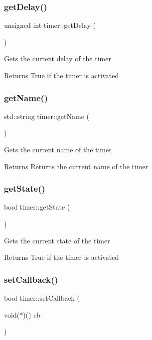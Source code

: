 \subsubsection{\texorpdfstring{get\+Delay()}{getDelay()}}
{\footnotesize\ttfamily unsigned int timer\+::get\+Delay (\begin{DoxyParamCaption}{ }\end{DoxyParamCaption})}

Gets the current delay of the timer \begin{DoxyReturn}{Returns}
True if the timer is activated 
\end{DoxyReturn}
\mbox{\label{classtimer_a30d5e497b9bee9b2d00c7f511c85e84d}} 
\subsubsection{\texorpdfstring{get\+Name()}{getName()}}
{\footnotesize\ttfamily std\+::string timer\+::get\+Name (\begin{DoxyParamCaption}{ }\end{DoxyParamCaption})}

Gets the current name of the timer \begin{DoxyReturn}{Returns}
Returns the current name of the timer 
\end{DoxyReturn}
\mbox{\label{classtimer_a35c72b981bb55b98e979f83a988f434c}} 
\subsubsection{\texorpdfstring{get\+State()}{getState()}}
{\footnotesize\ttfamily bool timer\+::get\+State (\begin{DoxyParamCaption}{ }\end{DoxyParamCaption})}

Gets the current state of the timer \begin{DoxyReturn}{Returns}
True if the timer is activated 
\end{DoxyReturn}
\mbox{\label{classtimer_a68517332f9664a28d04df45911127d1a}} 
\subsubsection{\texorpdfstring{set\+Callback()}{setCallback()}}
{\footnotesize\ttfamily bool timer\+::set\+Callback (\begin{DoxyParamCaption}\item[{void($\ast$)()}]{cb }\end{DoxyParamCaption})}

